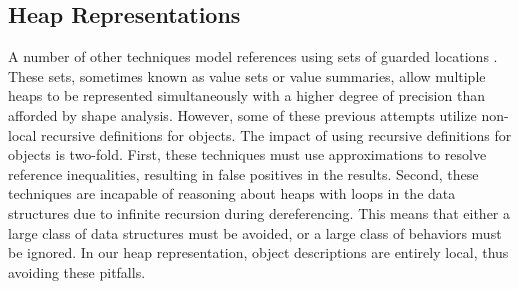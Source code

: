 \subsection{Heap Representations}
A number of other techniques model references using sets of guarded locations \cite{Xie:2005,Cherem:2007,Dillig:2011}. These sets, sometimes known as value sets or value summaries, allow multiple heaps to be represented simultaneously with a higher degree of precision than afforded by shape analysis. However, some of these previous attempts utilize non-local recursive definitions for objects. The impact of using recursive definitions for objects is two-fold. First, these techniques must use approximations to resolve reference inequalities, resulting in false positives in the results. Second, these techniques are incapable of reasoning about heaps with loops in the data structures due to infinite recursion during dereferencing. This means that either a large class of data structures must be avoided, or a large class of behaviors must be ignored. In our heap representation, object descriptions are entirely local, thus avoiding these pitfalls.